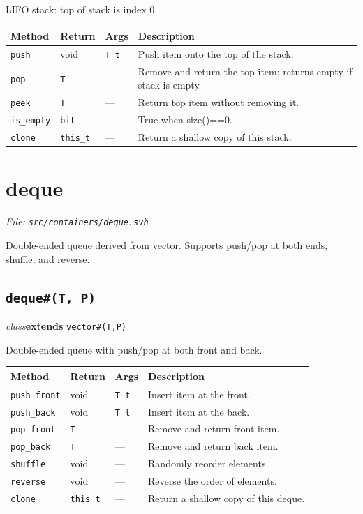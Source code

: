 \documentclass[11pt,letterpaper]{report}
\begin{document}
LIFO stack: top of stack is index 0.

\begin{xltabular}{\linewidth}{>{\small}p{1.35in} >{\small}p{1.25in} >{\small}p{0.95in} >{\small}X}
\toprule
\textbf{Method} & \textbf{Return} & \textbf{Args} & \textbf{Description} \\
\midrule
\endhead
\bottomrule
\endfoot
\texttt{push} & void & \texttt{T t} & Push item onto the top of the stack. \\
\texttt{pop} & \texttt{T} & --- & Remove and return the top item; returns empty if stack is empty. \\
\texttt{peek} & \texttt{T} & --- & Return top item without removing it. \\
\texttt{is\_empty} & \texttt{bit} & --- & True when size()==0. \\
\texttt{clone} & \texttt{this\_t} & --- & Return a shallow copy of this stack. \\
\end{xltabular}

\section{deque}
\noindent\small\textit{File: \texttt{src/containers/deque.svh}}\par

Double-ended queue derived from vector. Supports push/pop at both ends, shuffle, and reverse.

\subsection*{\texttt{deque\#(T, P)}}
\noindent\small\textit{class}\quad \textbf{extends} \texttt{vector\#(T,P)}\par

Double-ended queue with push/pop at both front and back.

\begin{xltabular}{\linewidth}{>{\small}p{1.35in} >{\small}p{1.25in} >{\small}p{0.95in} >{\small}X}
\toprule
\textbf{Method} & \textbf{Return} & \textbf{Args} & \textbf{Description} \\
\midrule
\endhead
\bottomrule
\endfoot
\texttt{push\_front} & void & \texttt{T t} & Insert item at the front. \\
\texttt{push\_back} & void & \texttt{T t} & Insert item at the back. \\
\texttt{pop\_front} & \texttt{T} & --- & Remove and return front item. \\
\texttt{pop\_back} & \texttt{T} & --- & Remove and return back item. \\
\texttt{shuffle} & void & --- & Randomly reorder elements. \\
\texttt{reverse} & void & --- & Reverse the order of elements. \\
\texttt{clone} & \texttt{this\_t} & --- & Return a shallow copy of this deque. \\
\end{xltabular}
\end{document}
